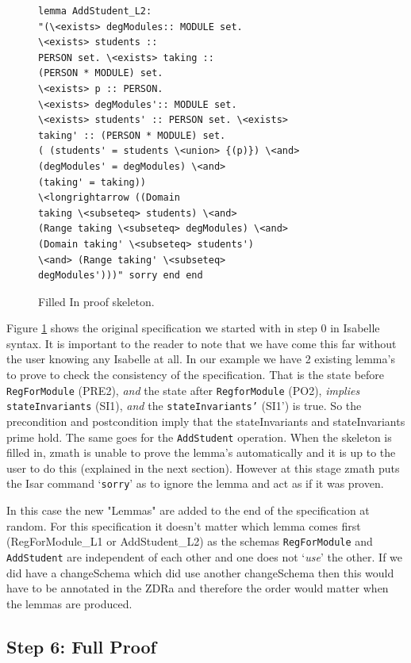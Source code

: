 \begin{figure}[H]
\begin{minipage}{0.45\textwidth}
\begin{scriptsize}
\begin{BVerbatim}
lemma AddStudent_L2: 
"(\<exists> degModules:: MODULE set. 
\<exists> students ::
PERSON set. \<exists> taking :: 
(PERSON * MODULE) set. 
\<exists> p :: PERSON.
\<exists> degModules':: MODULE set. 
\<exists> students' :: PERSON set. \<exists>
taking' :: (PERSON * MODULE) set. 
( (students' = students \<union> {(p)}) \<and>
(degModules' = degModules) \<and> 
(taking' = taking)) 
\<longrightarrow ((Domain
taking \<subseteq> students) \<and> 
(Range taking \<subseteq> degModules) \<and>
(Domain taking' \<subseteq> students') 
\<and> (Range taking' \<subseteq>
degModules')))" sorry end end
\end{BVerbatim}
\end{scriptsize}
\end{minipage}
\caption{Filled In proof skeleton. \label{fig:fillinFullexample}}
\end{figure}

Figure \ref{fig:fillinFullexample} shows the original specification we started
with in step 0 in Isabelle syntax. It is important to the reader to note that we
have come this far without the user knowing any Isabelle at all. In our example
we have 2 existing lemma's to prove to check the consistency of the
specification. That is the state before \texttt{RegForModule} (PRE2), \emph{and}
the state after \texttt{RegforModule} (PO2), \emph{implies}
\texttt{stateInvariants} (SI1), \emph{and} the \texttt{stateInvariants'} (SI1')
is true. So the precondition and postcondition imply that the stateInvariants
and stateInvariants prime hold. The same goes for the \texttt{AddStudent}
operation. When the skeleton is filled in, \gls{zmath} is unable to prove the
lemma's automatically and it is up to the user to do this (explained in the next
section). However at this stage \gls{zmath} puts the Isar command
`\texttt{sorry}' as to ignore the lemma and act as if it was proven.

In this case the new "Lemmas" are added to the end of the specification at random.
For this specification it doesn't matter which lemma comes first (RegForModule\_L1 or AddStudent\_L2)
as the schemas \texttt{RegForModule} and \texttt{AddStudent} are independent of
each other
and one does not `\textit{use}' the other. If we did have a changeSchema which did use another changeSchema
then this would have to be annotated in the ZDRa and therefore the order would matter when the lemmas are produced.


\subsection{Step 6: Full Proof}

